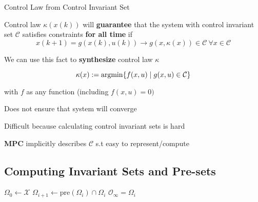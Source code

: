 \begin{sstTitleBox}[BrickRed]{
		Control Law from Control Invariant Set
	}

	\begin{sstOnlyFrame}[BrickRed]

		\begin{centering}
			Control law $\kappa(x(k))$ will \textbf{guarantee}
			that the system
			with control invariant set $\mathcal{C}$
			satisfies constraints \textbf{for all time} if
			$$x(k+1)=g(x(k),u(k))\to
				g(x,\kappa(x)) \in \mathcal{C} \ \forall x \in \mathcal{C}$$

			We can use this fact to \textbf{synthesize}
			control law $\kappa$

		\end{centering}
		\begin{sstFullFrame}[BrickRed]\color{white}
			\[
				\kappa(x):=\operatorname{argmin}\{f(x,u) \mid g(x,u)\in\mathcal{C}\}
			\]
		\end{sstFullFrame}

		with $f$ as any function (including $f(x,u)=0)$
	\end{sstOnlyFrame}

	\begin{sstOnlyFrame}[BrickRed]
		Does not ensure that system will converge

		Difficult because calculating control invariant sets is hard

		\textbf{MPC} implicitly describes $\mathcal{C}$
		s.t easy to represent/compute
	\end{sstOnlyFrame}
\end{sstTitleBox}


\subsection{Computing Invariant Sets and Pre-sets}


\begin{minipage}{0.53\linewidth}
	\begin{sstFullFrame}[ForestGreen]
		\color{white}
		\begin{algorithmic}
			\State $\Omega_0 \leftarrow \mathcal{X}$
			\Loop
			\State $\Omega_{i+1} \leftarrow \mathrm{pre}(\Omega_i)\cap\Omega_i$
			\State\Return $\mathcal{O}_\infty = \Omega_i$
			\EndIf
			\EndLoop
		\end{algorithmic}
	\end{sstFullFrame}
\end{minipage}

